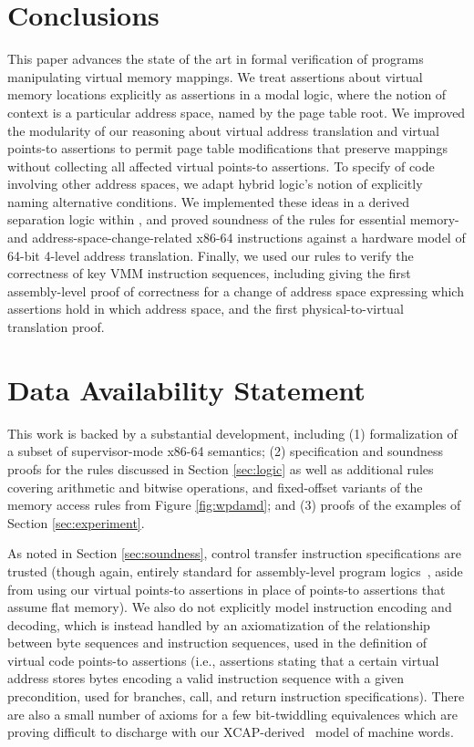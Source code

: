 \documentclass[acmsmall,screen,nonacm,review,anonymous]{acmart}
\begin{document}
\section{Conclusions}
This paper advances the state of the art in formal verification of programs manipulating virtual memory mappings.
We treat assertions about virtual
memory locations explicitly as assertions in a modal logic, where the notion of context
is a particular address space, named by the page table root.
We improved the modularity of our reasoning about virtual address translation and virtual points-to assertions
to permit page table modifications that
preserve mappings without collecting all affected virtual points-to assertions.
To specify of code involving other address spaces, we adapt 
hybrid logic's notion of explicitly naming alternative conditions.
We implemented these ideas in a derived separation logic within \iris, and proved soundness of
the rules for essential memory- and address-space-change-related x86-64 instructions 
against a hardware model of 64-bit 4-level address translation.
Finally, we used our rules to verify the correctness of key VMM instruction sequences,
including giving the first assembly-level proof of correctness for a change
of address space expressing which assertions hold in which address space, 
and the first physical-to-virtual translation proof.

\section*{Data Availability Statement}
This work is backed by a substantial \rocq development, including
(1) formalization of a subset of supervisor-mode x86-64 semantics;
(2) specification and soundness proofs for the rules discussed in Section \ref{sec:logic}
as well as additional rules covering arithmetic and bitwise operations,
and fixed-offset variants of the memory access rules from Figure \ref{fig:wpdamd};
and (3) proofs of the examples of Section \ref{sec:experiment}.

As noted in Section \ref{sec:soundness}, control transfer instruction
specifications are trusted (though again, entirely standard for assembly-level program logics~\cite{ni2007contexts,Ni2006codeptrs},
aside from using our virtual points-to assertions in place of points-to assertions that assume flat memory).
We also do not explicitly model instruction
encoding and decoding, which is instead handled by an axiomatization of the relationship between
byte sequences and instruction sequences, used in the definition of virtual code points-to
assertions (i.e., assertions stating that a certain virtual address stores bytes
encoding a valid instruction sequence with a given precondition, used for branches, call, and return instruction
specifications). 
There are also a small number of axioms for a few bit-twiddling equivalences which are proving difficult to discharge
with our XCAP-derived~\cite{Chlipala2013Bedrock} model of machine words.
\end{document}
